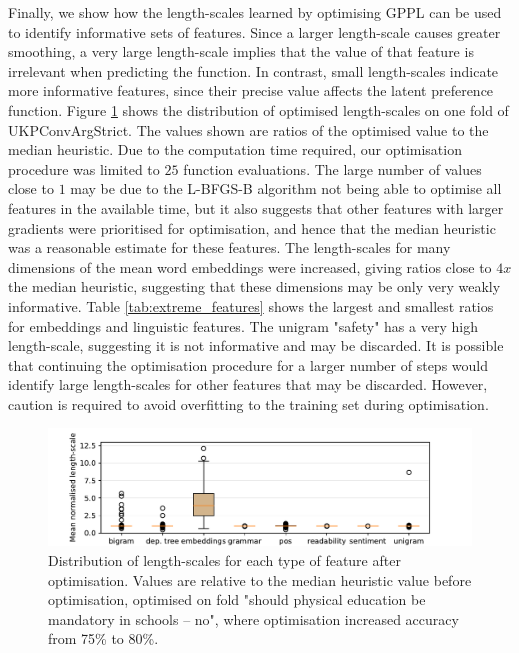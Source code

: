 Finally, we show how the length-scales learned by optimising GPPL can be used to identify
informative sets of features. Since a larger length-scale causes greater smoothing, 
a very large length-scale implies that the value of that feature is irrelevant when predicting 
the function. In contrast, small length-scales indicate more informative features, since their
precise value affects the latent preference function.
Figure \ref{fig:boxplot} shows the distribution of optimised length-scales on one fold of UKPConvArgStrict. The values shown are ratios of the optimised value to the median heuristic. 
Due to the computation time required, our optimisation procedure was limited to $25$ function evaluations. The large number of values close to $1$ may be due to the L-BFGS-B
algorithm not being able to optimise all features in the available time, but 
it also suggests that other features with larger gradients were prioritised for optimisation,
and hence that the median heuristic was a reasonable estimate for these features. 
The length-scales for many dimensions of the mean word embeddings were increased,
giving ratios close to $4x$ the median heuristic, suggesting that these dimensions may be
only very weakly informative. Table \ref{tab:extreme_features} shows the largest
and smallest ratios for embeddings and linguistic features. The unigram "safety" has
a very high length-scale, suggesting it is not informative and may be discarded. 
It is possible that continuing the optimisation procedure for a larger number of steps would 
identify large length-scales for other features that may be discarded. However, caution is 
required to avoid overfitting to the training set during optimisation\cite{overfitting_ml2}.
\begin{figure}
\includegraphics[width=\textwidth]{figures/features/boxplot}
\caption{Distribution of length-scales for each type of feature after optimisation. 
Values are relative to the median heuristic value before optimisation, optimised 
on fold "should physical education be mandatory in schools -- no", where 
optimisation increased accuracy from 75\% to 80\%. }
\label{fig:boxplot}
\end{figure}
